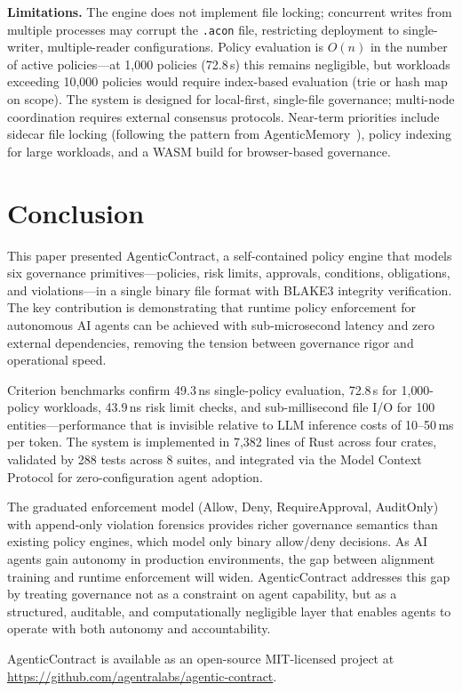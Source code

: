 \documentclass[10pt, twocolumn]{article}
\begin{document}
\textbf{Limitations.} The engine does not implement file locking; concurrent writes from multiple processes may corrupt the \texttt{.acon} file, restricting deployment to single-writer, multiple-reader configurations. Policy evaluation is $O(n)$ in the number of active policies---at 1{,}000 policies (72.8\,\textmu{}s) this remains negligible, but workloads exceeding 10{,}000 policies would require index-based evaluation (trie or hash map on scope). The system is designed for local-first, single-file governance; multi-node coordination requires external consensus protocols. Near-term priorities include sidecar file locking (following the pattern from AgenticMemory~\cite{agenticmemory2026}), policy indexing for large workloads, and a WASM build for browser-based governance.

\section{Conclusion}
\label{sec:conclusion}

This paper presented AgenticContract, a self-contained policy engine that models six governance primitives---policies, risk limits, approvals, conditions, obligations, and violations---in a single binary file format with BLAKE3 integrity verification. The key contribution is demonstrating that runtime policy enforcement for autonomous AI agents can be achieved with sub-microsecond latency and zero external dependencies, removing the tension between governance rigor and operational speed.

Criterion benchmarks confirm 49.3\,ns single-policy evaluation, 72.8\,\textmu{}s for 1{,}000-policy workloads, 43.9\,ns risk limit checks, and sub-millisecond file I/O for 100 entities---performance that is invisible relative to LLM inference costs of 10--50\,ms per token. The system is implemented in 7{,}382 lines of Rust across four crates, validated by 288 tests across 8 suites, and integrated via the Model Context Protocol for zero-configuration agent adoption.

The graduated enforcement model (Allow, Deny, RequireApproval, AuditOnly) with append-only violation forensics provides richer governance semantics than existing policy engines, which model only binary allow/deny decisions. As AI agents gain autonomy in production environments, the gap between alignment training and runtime enforcement will widen. AgenticContract addresses this gap by treating governance not as a constraint on agent capability, but as a structured, auditable, and computationally negligible layer that enables agents to operate with both autonomy and accountability.

AgenticContract is available as an open-source MIT-licensed project at \url{https://github.com/agentralabs/agentic-contract}.



\end{document}
